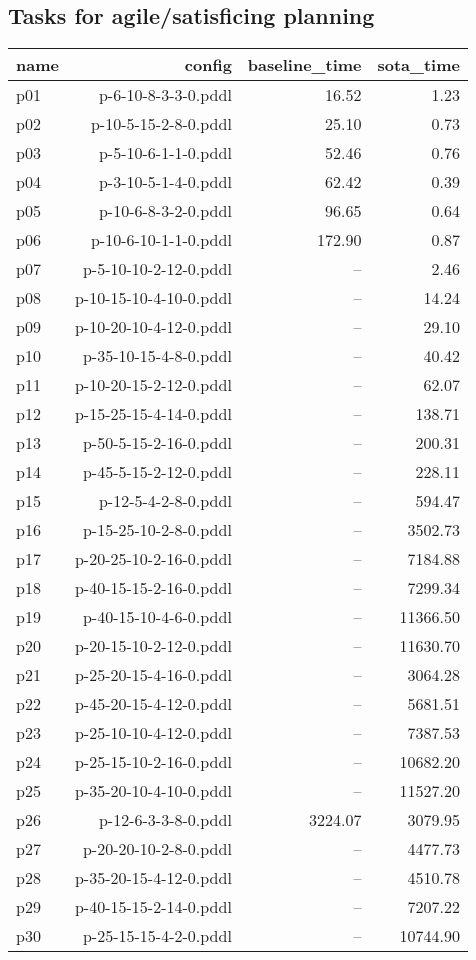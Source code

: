 \documentclass{article}
\begin{document}
                    \subsection*{Tasks for agile/satisficing planning}
                    
                            \begin{center}
                            \scriptsize
                            \begin{tabular}{@{}l|r|r|r@{}}
                            name & config & baseline\_time & sota\_time\\\midrule
                              p01& p-6-10-8-3-3-0.pddl&16.52&1.23\\
  p02& p-10-5-15-2-8-0.pddl&25.10&0.73\\
  p03& p-5-10-6-1-1-0.pddl&52.46&0.76\\
  p04& p-3-10-5-1-4-0.pddl&62.42&0.39\\
  p05& p-10-6-8-3-2-0.pddl&96.65&0.64\\
  p06& p-10-6-10-1-1-0.pddl&172.90&0.87\\
  p07& p-5-10-10-2-12-0.pddl&--&2.46\\
  p08& p-10-15-10-4-10-0.pddl&--&14.24\\
  p09& p-10-20-10-4-12-0.pddl&--&29.10\\
  p10& p-35-10-15-4-8-0.pddl&--&40.42\\
  p11& p-10-20-15-2-12-0.pddl&--&62.07\\
  p12& p-15-25-15-4-14-0.pddl&--&138.71\\
  p13& p-50-5-15-2-16-0.pddl&--&200.31\\
  p14& p-45-5-15-2-12-0.pddl&--&228.11\\
  p15& p-12-5-4-2-8-0.pddl&--&594.47\\
  p16& p-15-25-10-2-8-0.pddl&--&3502.73\\
  p17& p-20-25-10-2-16-0.pddl&--&7184.88\\
  p18& p-40-15-15-2-16-0.pddl&--&7299.34\\
  p19& p-40-15-10-4-6-0.pddl&--&11366.50\\
  p20& p-20-15-10-2-12-0.pddl&--&11630.70\\
  p21& p-25-20-15-4-16-0.pddl&--&3064.28\\
  p22& p-45-20-15-4-12-0.pddl&--&5681.51\\
  p23& p-25-10-10-4-12-0.pddl&--&7387.53\\
  p24& p-25-15-10-2-16-0.pddl&--&10682.20\\
  p25& p-35-20-10-4-10-0.pddl&--&11527.20\\
  p26& p-12-6-3-3-8-0.pddl&3224.07&3079.95\\
  p27& p-20-20-10-2-8-0.pddl&--&4477.73\\
  p28& p-35-20-15-4-12-0.pddl&--&4510.78\\
  p29& p-40-15-15-2-14-0.pddl&--&7207.22\\
  p30& p-25-15-15-4-2-0.pddl&--&10744.90
                            \end{tabular}
                            \end{center}
                    
\end{document}
